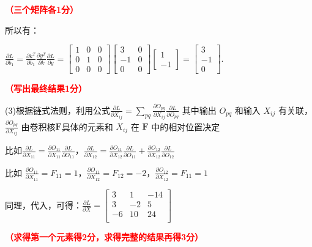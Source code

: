 \documentclass[12pt,a4paper,openany,twoside]{ctexbook}
\begin{document}
\begin{Solution}
	\hfill \textcolor{red}{\textbf{（三个矩阵各1分）}}

	所以有：

	$\frac{\partial L}{\partial b_1} =
	\frac{\partial {k}^T}{\partial b_1}
	\frac{\partial {y}^T}{\partial {k}}
	\frac{\partial L}{\partial {y}} =
	\begin{bmatrix}
	1 & 0 & 0 \\
	0 & 1 & 0 \\
	0 & 0 & 0
	\end{bmatrix}
	\begin{bmatrix}
	3 & 0 \\
	-1 & 0 \\
	0 & 0
	\end{bmatrix}
	\begin{bmatrix}
	1 \\
	-1
	\end{bmatrix}
	=
	\begin{bmatrix}
	3 \\
	-1 \\
	0
	\end{bmatrix}.$

	\hfill \textcolor{red}{\textbf{（写出最终结果1分）}}

	(3)根据链式法则，利用公式$\frac{{\partial}L}{{\partial}X_{ij}}=\underset{pq}{\sum} \frac{{\partial}O_{pq}}{{\partial}X_{ij}}\frac{{\partial}L}{{\partial}O_{pq}}$ 其中输出 $O_{pq}$ 和输入 $X_{ij}$ 有关联，$\frac{{\partial}O_{pq}}{{\partial}X_{ij}}$ 由卷积核$\mathbf{F}$具体的元素和 $X_{ij}$ 在 $\mathbf{F}$ 中的相对位置决定

	比如$\frac{{\partial}L}{{\partial}X_{11}}=\frac{{\partial}O_{11}}{{\partial}X_{11}}\frac{{\partial}L}{{\partial}O_{11}}$，$\frac{{\partial}L}{{\partial}X_{12}}=\frac{{\partial}O_{11}}{{\partial}X_{12}}\frac{{\partial}L}{{\partial}O_{11}}+\frac{{\partial}O_{12}}{{\partial}X_{12}}\frac{{\partial}L}{{\partial}O_{12}}$
	
	比如 $\frac{{\partial}O_{11}}{{\partial}X_{11}}=F_{11}=1$，$\frac{{\partial}O_{11}}{{\partial}X_{12}}=F_{12}=-2$，$\frac{{\partial}O_{12}}{{\partial}X_{12}}=F_{11}=1$
	
	同理，代入，可得：$\frac{{\partial}L}{{\partial}X}=\begin{bmatrix}  
		3 & 1 & -14  \\  
		3 & -2 & 5 \\  
		-6 & 10 & 24  \\
		\end{bmatrix}$

	\hfill \textcolor{red}{\textbf{（求得第一个元素得2分，求得完整的结果再得3分）}}
\end{Solution}
\end{document}

